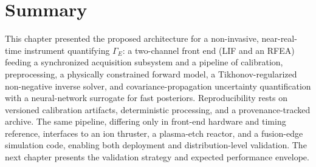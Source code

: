 \section{Summary}

This chapter presented the proposed architecture for a non-invasive, near-real-time instrument quantifying $\Gamma_{E}$: a two-channel front end (LIF and an RFEA) feeding a synchronized acquisition subsystem and a pipeline of calibration, preprocessing, a physically constrained forward model, a Tikhonov-regularized non-negative inverse solver, and covariance-propagation uncertainty quantification with a neural-network surrogate for fast posteriors. Reproducibility rests on versioned calibration artifacts, deterministic processing, and a provenance-tracked archive. The same pipeline, differing only in front-end hardware and timing reference, interfaces to an ion thruster, a plasma-etch reactor, and a fusion-edge simulation code, enabling both deployment and distribution-level validation. The next chapter presents the validation strategy and expected performance envelope.
